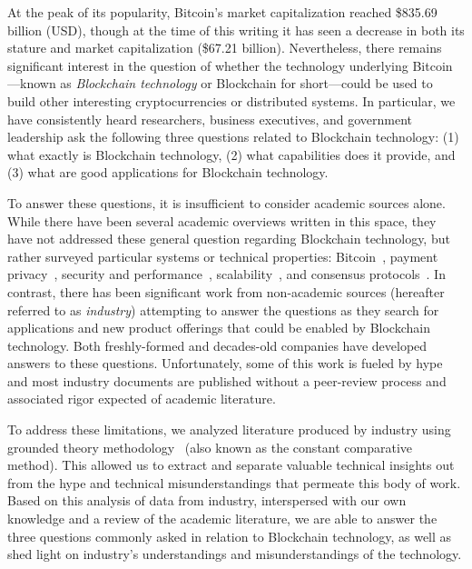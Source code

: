 At the peak of its popularity, Bitcoin's market capitalization reached \$835.69 billion (USD), though at the time of this writing it has seen a decrease in both its stature and market capitalization (\$67.21 billion).
Nevertheless, there remains significant interest in the question of whether the technology underlying Bitcoin---known as \emph{Blockchain technology} or {Blockchain} for short---could be used to build other interesting cryptocurrencies or distributed systems.
In particular, we have consistently heard researchers, business executives, and government leadership ask the following three questions related to Blockchain technology: (1) what exactly is Blockchain technology, (2) what capabilities does it provide, and (3) what are good applications for Blockchain technology.%

To answer these questions, it is insufficient to consider academic sources alone.
While there have been several academic overviews written in this space, they have not addressed these general question regarding Blockchain technology, but rather surveyed particular systems or technical properties: Bitcoin~\cite{BMC+15,Narayanan17}, payment privacy~\cite{Conti17}, security and performance~\cite{Gervais16}, scalability~\cite{Croman16}, and consensus protocols~\cite{Bano17,garay2018consensus}.
In contrast, there has been significant work from non-academic sources (hereafter referred to as \emph{industry}) attempting to answer the questions as they search for applications and new product offerings that could be enabled by Blockchain technology.  Both freshly-formed and decades-old companies have developed answers to these questions.  Unfortunately, some of this work is fueled by hype and most industry documents are published without a peer-review process and associated rigor expected of academic literature.

To address these limitations, we analyzed literature produced by industry using grounded theory methodology~\cite{glaser1965constant,strauss1990basics,corbin1990grounded} (also known as the constant comparative method).
This allowed us to extract and separate valuable technical insights out from the hype and technical misunderstandings that permeate this body of work.
Based on this analysis of data from industry, interspersed with our own knowledge and a review of the academic literature, we are able to answer the three questions commonly asked in relation to Blockchain technology, as well as shed light on industry's understandings and misunderstandings of the technology. 

